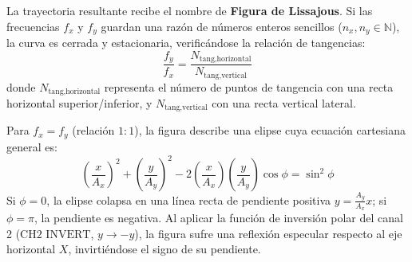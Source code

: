 La trayectoria resultante recibe el nombre de \textbf{Figura de Lissajous}. Si las frecuencias $f_x$ y $f_y$ guardan una razón de números enteros sencillos ($n_x, n_y \in \mathbb{N}$), la curva es cerrada y estacionaria, verificándose la relación de tangencias:
\begin{equation}
    \frac{f_y}{f_x} = \frac{N_{\text{tang,horizontal}}}{N_{\text{tang,vertical}}} \label{eq:lissajous_ratio}
\end{equation}
donde $N_{\text{tang,horizontal}}$ representa el número de puntos de tangencia con una recta horizontal superior/inferior, y $N_{\text{tang,vertical}}$ con una recta vertical lateral.

Para $f_x = f_y$ (relación $1:1$), la figura describe una elipse cuya ecuación cartesiana general es:
\begin{equation}
    \left(\frac{x}{A_x}\right)^2 + \left(\frac{y}{A_y}\right)^2 - 2\left(\frac{x}{A_x}\right)\left(\frac{y}{A_y}\right)\cos\phi = \sin^2\phi \label{eq:elipse_lissajous}
\end{equation}
Si $\phi = 0$, la elipse colapsa en una línea recta de pendiente positiva $y = \frac{A_y}{A_x} x$; si $\phi = \pi$, la pendiente es negativa. Al aplicar la función de inversión polar del canal 2 ($\text{CH2 INVERT}$, $y \to -y$), la figura sufre una reflexión especular respecto al eje horizontal $X$, invirtiéndose el signo de su pendiente.